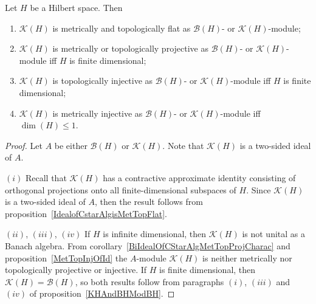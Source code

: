 \begin{proposition}\label{KHAndBHModKH} Let $H$ be a Hilbert space. Then 

\begin{enumerate}[label = (\roman*)]
    \item $\mathcal{K}(H)$ is metrically and topologically flat 
    as $\mathcal{B}(H)$- or $\mathcal{K}(H)$-module;

    \item $\mathcal{K}(H)$ is metrically or topologically projective as
    $\mathcal{B}(H)$- or $\mathcal{K}(H)$-module iff $H$ is finite dimensional;

    \item $\mathcal{K}(H)$ is topologically injective as $\mathcal{B}(H)$- 
    or $\mathcal{K}(H)$-module iff $H$ is finite dimensional;

    \item $\mathcal{K}(H)$ is metrically injective as $\mathcal{B}(H)$- 
    or $\mathcal{K}(H)$-module iff $\dim(H)\leq 1$.
\end{enumerate}
\end{proposition}
\begin{proof} Let $A$ be either $\mathcal{B}(H)$ or $\mathcal{K}(H)$. Note that
$\mathcal{K}(H)$ is a two-sided ideal of $A$. 

$(i)$ Recall that $\mathcal{K}(H)$ has a contractive approximate identity
consisting of orthogonal projections onto all finite-dimensional subspaces of
$H$. Since $\mathcal{K}(H)$ is a two-sided ideal of $A$, then the result follows
from proposition~\ref{IdealofCstarAlgisMetTopFlat}.

$(ii)$, $(iii)$, $(iv)$ If $H$ is infinite dimensional, then $\mathcal{K}(H)$ is
not unital as a Banach algebra. From
corollary~\ref{BiIdealOfCStarAlgMetTopProjCharac} and
proposition~\ref{MetTopInjOfId} the $A$-module $\mathcal{K}(H)$ is neither
metrically nor topologically projective or injective. If $H$ is finite
dimensional, then $\mathcal{K}(H)=\mathcal{B}(H)$, so both results follow from
paragraphs $(i)$, $(iii)$ and $(iv)$ of proposition~\ref{KHAndBHModBH}.
\end{proof}

